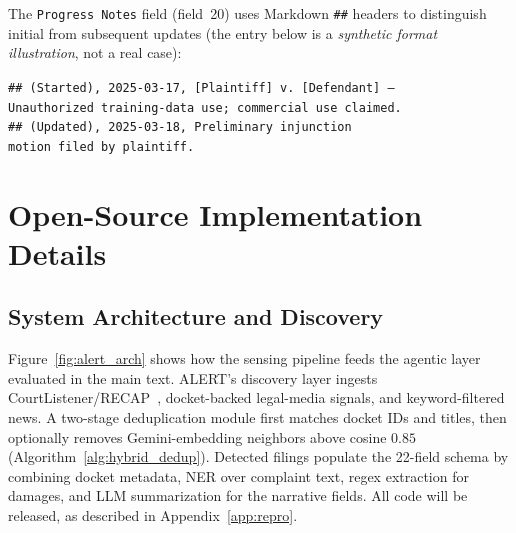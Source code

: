 The \texttt{Progress Notes} field (field~20) uses Markdown \texttt{\#\#} headers to distinguish initial from subsequent updates (the entry below is a \emph{synthetic format illustration}, not a real case):
\begin{mycodebox}
\small\texttt{\#\# (Started), 2025-03-17, [Plaintiff] v.\ [Defendant] ---}\\
\texttt{\phantom{xxxx}Unauthorized training-data use; commercial use claimed.}\\
\texttt{\#\# (Updated), 2025-03-18, Preliminary injunction}\\
\texttt{\phantom{xxxx}motion filed by plaintiff.}
\end{mycodebox}

\section{Open-Source Implementation Details}
\label{app:impl}

\subsection{System Architecture and Discovery}

Figure~\ref{fig:alert_arch} shows how the sensing pipeline feeds the agentic layer evaluated in the main text. ALERT's discovery layer ingests CourtListener/RECAP~\citep{courtlistener2023}, docket-backed legal-media signals, and keyword-filtered news. A two-stage deduplication module first matches docket IDs and titles, then optionally removes Gemini-embedding neighbors above cosine $0.85$ (Algorithm~\ref{alg:hybrid_dedup}). Detected filings populate the 22-field \schemafile{} schema by combining docket metadata, NER over complaint text, regex extraction for damages, and LLM summarization for the narrative fields.
All code will be released, as described in Appendix~\ref{app:repro}.

